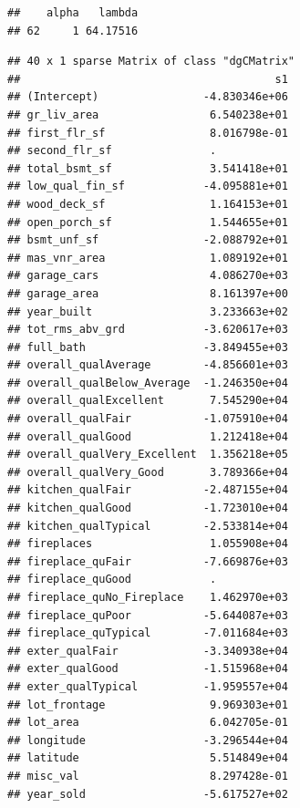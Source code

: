 \documentclass[
]{article}
\newenvironment{Shaded}{\begin{snugshade}}{\end{snugshade}}
\newcommand{\CommentTok}[1]{\textcolor[rgb]{0.56,0.35,0.01}{\textit{#1}}}
\newcommand{\FunctionTok}[1]{\textcolor[rgb]{0.00,0.00,0.00}{#1}}
\newcommand{\NormalTok}[1]{#1}
\newcommand{\SpecialCharTok}[1]{\textcolor[rgb]{0.00,0.00,0.00}{#1}}
\begin{document}
\begin{Shaded}
\end{Shaded}

\begin{verbatim}
##    alpha   lambda
## 62     1 64.17516
\end{verbatim}

\begin{Shaded}
\end{Shaded}

\begin{verbatim}
## 40 x 1 sparse Matrix of class "dgCMatrix"
##                                       s1
## (Intercept)                -4.830346e+06
## gr_liv_area                 6.540238e+01
## first_flr_sf                8.016798e-01
## second_flr_sf               .           
## total_bsmt_sf               3.541418e+01
## low_qual_fin_sf            -4.095881e+01
## wood_deck_sf                1.164153e+01
## open_porch_sf               1.544655e+01
## bsmt_unf_sf                -2.088792e+01
## mas_vnr_area                1.089192e+01
## garage_cars                 4.086270e+03
## garage_area                 8.161397e+00
## year_built                  3.233663e+02
## tot_rms_abv_grd            -3.620617e+03
## full_bath                  -3.849455e+03
## overall_qualAverage        -4.856601e+03
## overall_qualBelow_Average  -1.246350e+04
## overall_qualExcellent       7.545290e+04
## overall_qualFair           -1.075910e+04
## overall_qualGood            1.212418e+04
## overall_qualVery_Excellent  1.356218e+05
## overall_qualVery_Good       3.789366e+04
## kitchen_qualFair           -2.487155e+04
## kitchen_qualGood           -1.723010e+04
## kitchen_qualTypical        -2.533814e+04
## fireplaces                  1.055908e+04
## fireplace_quFair           -7.669876e+03
## fireplace_quGood            .           
## fireplace_quNo_Fireplace    1.462970e+03
## fireplace_quPoor           -5.644087e+03
## fireplace_quTypical        -7.011684e+03
## exter_qualFair             -3.340938e+04
## exter_qualGood             -1.515968e+04
## exter_qualTypical          -1.959557e+04
## lot_frontage                9.969303e+01
## lot_area                    6.042705e-01
## longitude                  -3.296544e+04
## latitude                    5.514849e+04
## misc_val                    8.297428e-01
## year_sold                  -5.617527e+02
\end{verbatim}
\end{document}
